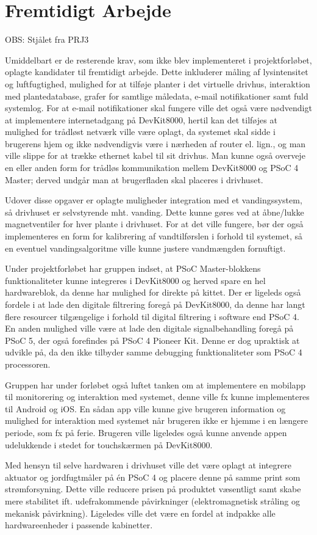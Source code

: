 \chapter{Fremtidigt Arbejde} \label{ch:Fremtidigt_arbejde}

OBS: Stjålet fra PRJ3

Umiddelbart er de resterende krav, som ikke blev implementeret i projektforløbet, oplagte kandidater til fremtidigt arbejde.
Dette inkluderer måling af lysintensitet og luftfugtighed, mulighed for at tilføje planter i det virtuelle drivhus, interaktion med plantedatabase, grafer for samtlige måledata, e-mail notifikationer samt fuld systemlog.
For at e-mail notifikationer skal fungere ville det også være nødvendigt at implementere internetadgang på DevKit8000, hertil kan det tilføjes at mulighed for trådløst netværk ville være oplagt, da systemet skal sidde i brugerens hjem og ikke nødvendigvis være i nærheden af router el. lign., og man ville slippe for at trække ethernet kabel til sit drivhus.
Man kunne også overveje en eller anden form for trådløs kommunikation mellem DevKit8000 og PSoC 4 Master; derved undgår man at brugerfladen skal placeres i drivhuset. 

Udover disse opgaver er oplagte muligheder integration med et vandingssystem, så drivhuset er selvstyrende mht. vanding. 
Dette kunne gøres ved at åbne/lukke magnetventiler for hver plante i drivhuset. 
For at det ville fungere, bør der også implementeres en form for kalibrering af vandtilførslen i forhold til systemet, så en eventuel vandingsalgoritme ville kunne justere vandmængden fornuftigt.

Under projektforløbet har gruppen indset, at PSoC Master-blokkens funktionaliteter kunne integreres i DevKit8000 og herved spare en hel hardwareblok, da denne har mulighed for \IIC direkte på kittet.
Der er ligeleds også fordele i at lade den digitale filtrering foregå på DevKit8000, da denne har langt flere resourcer tilgængelige i forhold til digital filtrering i software end PSoC 4.
En anden mulighed ville være at lade den digitale signalbehandling foregå på PSoC 5, der også forefindes på PSoC 4 Pioneer Kit.
Denne er dog upraktisk at udvikle på, da den ikke tilbyder samme debugging funktionaliteter som PSoC 4 processoren.

Gruppen har under forløbet også luftet tanken om at implementere en mobilapp til monitorering og interaktion med systemet, denne ville fx kunne implementeres til Android og iOS.
En sådan app ville kunne give brugeren information og mulighed for interaktion med systemet når brugeren ikke er hjemme i en længere periode, som fx på ferie.
Brugeren ville ligeledes også kunne anvende appen udelukkende i stedet for touchskærmen på DevKit8000.

Med hensyn til selve hardwaren i drivhuset ville det være oplagt at integrere aktuator og jordfugtmåler på én PSoC 4 og placere denne på samme print som strømforsyning. 
Dette ville reducere prisen på produktet væsentligt samt skabe mere stabilitet ift. udefrakommende påvirkninger (elektromagnetisk stråling og mekanisk påvirkning).
Ligeledes ville det være en fordel at indpakke alle hardwareenheder i passende kabinetter.